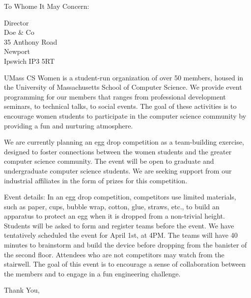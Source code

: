 \documentclass{letter}
\begin{document}
\opening{To Whome It May Concern:}{Director \\ Doe \& Co \\ 35 Anthony Road
\\ Newport \\ Ipswich IP3 5RT}

UMass CS Women is a student-run organization of over 50 members, housed in the University of Massachusetts School of Computer Science. We provide event programming for our members that ranges from professional development seminars, to technical talks, to social events. The goal of these activities is to encourage women students to participate in the computer science community by providing a fun and nurturing atmosphere. 

We are currently planning an egg drop competition as a team-building exercise, designed to foster connections between the women students and the greater computer science community. The event will be open to graduate and undergraduate computer science students. We are seeking support from our industrial affiliates in the form of prizes for this competition. 

Event details: In an egg drop competition, competitors use limited materials, such as paper, cups, bubble wrap, cotton, glue, straws, etc., to build an apparatus to protect an egg when it is dropped from a non-trivial height. Students will be asked to form and register teams before the event. We have tentatively scheduled the event for April 1st, at 4PM. The teams will have 40 minutes to brainstorm and build the device before dropping from the banister of the second floor. Attendees who are not competitors may watch from the stairwell. The goal of this event is to encourage a sense of collaboration between the members and to engage in a fun engineering challenge.
	
	\closing{Thank You,}
	
\end{document}
